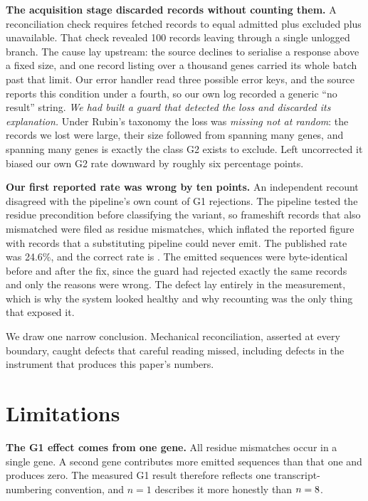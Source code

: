 \documentclass{article}
\begin{document}
\textbf{The acquisition stage discarded records without counting them.} A
reconciliation check requires fetched records to equal admitted plus excluded
plus unavailable. That check revealed 100 records leaving through a single
unlogged branch. The cause lay upstream: the source declines to serialise a
response above a fixed size, and one record listing over a thousand genes
carried its whole batch past that limit. Our error handler read three possible
error keys, and the source reports this condition under a fourth, so our own
log recorded a generic ``no result'' string. \emph{We had built a guard that
detected the loss and discarded its explanation.} Under Rubin's taxonomy
\citep{rubin} the loss was \emph{missing not at random}: the records we lost
were large, their size followed from spanning many genes, and spanning many
genes is exactly the class G2 exists to exclude. Left uncorrected it biased
our own G2 rate downward by roughly six percentage points.

\textbf{Our first reported rate was wrong by ten points.} An independent
recount disagreed with the pipeline's own count of G1 rejections. The pipeline
tested the residue precondition before classifying the variant, so frameshift
records that also mismatched were filed as residue mismatches, which inflated
the reported figure with records that a substituting pipeline could never
emit. The published rate was 24.6\%, and the correct rate is \GOneRate{}. The
emitted sequences were byte-identical before and after the fix, since the
guard had rejected exactly the same records and only the reasons were wrong.
The defect lay entirely in the measurement, which is why the system looked
healthy and why recounting was the only thing that exposed it.

We draw one narrow conclusion. Mechanical reconciliation, asserted at every
boundary, caught defects that careful reading missed, including defects in the
instrument that produces this paper's numbers.

\section{Limitations}

\textbf{The G1 effect comes from one gene.} All \GOneWrong{} residue
mismatches occur in a single gene. A second gene contributes more emitted
sequences than that one and produces zero. The measured G1 result therefore
reflects one transcript-numbering convention, and $n=1$ describes it more
honestly than $n=8{}$.
\end{document}
